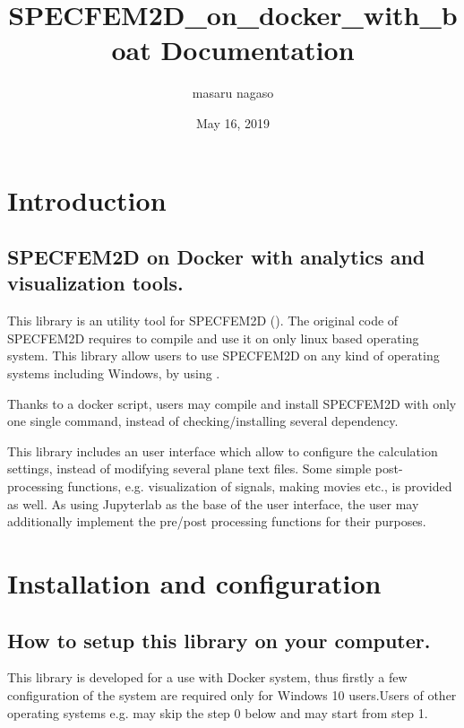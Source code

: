 \documentclass[letterpaper,10pt,english]{sphinxmanual}
\title{SPECFEM2D\_on\_docker\_with\_boat Documentation}
\date{May 16, 2019}
\author{masaru nagaso}
\begin{document}
\pagestyle{empty}
\sphinxmaketitle
\pagestyle{plain}
\sphinxtableofcontents
\pagestyle{normal}
\label{\detokenize{index::doc}}



\chapter{Introduction}
\label{\detokenize{introduction:introduction}}\label{\detokenize{introduction::doc}}

\section{SPECFEM2D on Docker with analytics and visualization tools.}
\label{\detokenize{introduction:specfem2d-on-docker-with-analytics-and-visualization-tools}}
This library is an utility tool for SPECFEM2D ().
The original code of SPECFEM2D requires to compile and use it on only linux based operating system.
This library allow users to use SPECFEM2D on any kind of operating systems including Windows, by using .

Thanks to a docker script, users may compile and install SPECFEM2D with only one single command, instead of checking/installing several dependency.

This library includes an user interface which allow to configure the calculation settings, instead of modifying several plane text files.
Some simple post-processing functions, e.g. visualization of signals, making movies etc., is provided as well.
As using Jupyterlab as the base of the user interface, the user may additionally implement the pre/post processing functions for their purposes.


\chapter{Installation and configuration}
\label{\detokenize{installation:installation-and-configuration}}\label{\detokenize{installation::doc}}

\section{How to setup this library on your computer.}
\label{\detokenize{installation:how-to-setup-this-library-on-your-computer}}
This library is developed for a use with Docker system, thus firstly a few configuration of the system are required only for Windows 10 users.Users of other operating systems e.g. may skip the step 0 below and may start from step 1.
\end{document}

